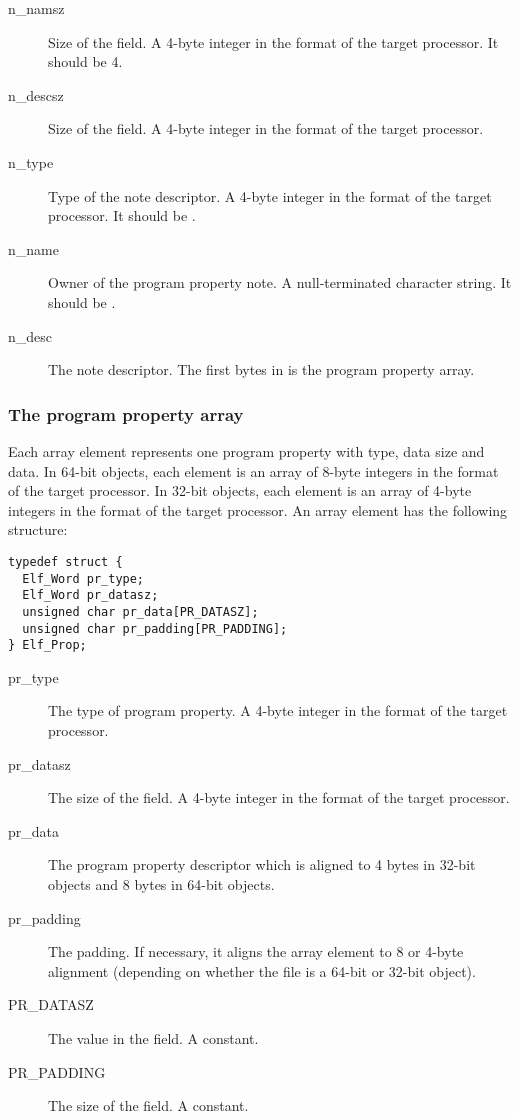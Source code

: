 \begin{description}
 \item[n_namsz] Size of the  field.  A 4-byte integer in the
   format of the target processor.  It should be 4.
 \item[n_descsz] Size of the  field.  A 4-byte integer in the
   format of the target processor.
 \item[n_type] Type of the note descriptor.  A 4-byte integer in the format
   of the target processor.  It should be .
 \item[n_name] Owner of the program property note.  A null-terminated
   character string.  It should be .
 \item[n_desc] The note descriptor.  The first  bytes in
    is the program property array.
\end{description}

\subsubsection{The program property array}

Each array element represents one program property with type, data size
and data.  In 64-bit objects, each element is an array of 8-byte integers
in the format of the target processor.  In 32-bit objects, each element
is an array of 4-byte integers in the format of the target processor.
An array element has the following structure:

\begin{verbatim}
typedef struct {
  Elf_Word pr_type;
  Elf_Word pr_datasz;
  unsigned char pr_data[PR_DATASZ];
  unsigned char pr_padding[PR_PADDING];
} Elf_Prop;
\end{verbatim}

\begin{description}
 \item[pr_type] The type of program property.  A 4-byte integer in the
   format of the target processor.
 \item[pr_datasz] The size of the  field.  A 4-byte
   integer in the format of the target processor.
 \item[pr_data] The program property descriptor which is aligned to 4
   bytes in 32-bit objects and 8 bytes in 64-bit objects.
 \item[pr_padding] The padding.  If necessary, it aligns the array
   element to 8 or 4-byte alignment (depending on whether the file is
   a 64-bit or 32-bit object).
 \item[PR_DATASZ] The value in the  field.  A constant.
 \item[PR_PADDING] The size of the  field.  A constant.
\end{description}

